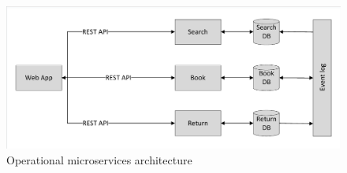 \begin{figure}
	\caption{Operational microservices architecture}
	\centering
	\includegraphics[trim = 5 5 5 5, clip, width=\textwidth]{img/operationmicro}
\end{figure}
